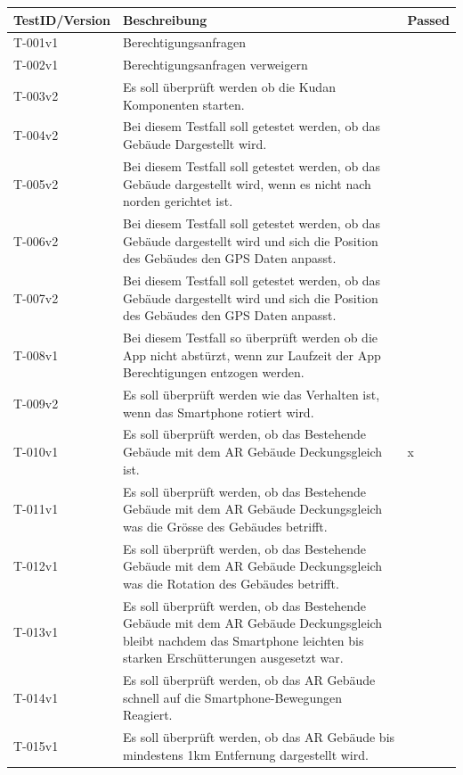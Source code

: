 \documentclass[a4paper]{scrreprt}
\begin{document}
\begin{tabularx}{\textwidth}{|l|X|l|}
\hline
	\textbf{TestID/Version }& \textbf{Beschreibung} & \textbf{Passed} \\
\hline
	T-001v1 & Berechtigungsanfragen & \checkmark \\
\hline
	T-002v1 & Berechtigungsanfragen verweigern & \checkmark \\
\hline
	T-003v2 & Es soll überprüft werden ob die Kudan Komponenten starten. & \checkmark \\
\hline
	T-004v2 & Bei diesem Testfall soll getestet werden, ob das Gebäude Dargestellt wird. & \checkmark \\
\hline
	T-005v2 & Bei diesem Testfall soll getestet werden, ob das Gebäude dargestellt wird, wenn es nicht nach norden gerichtet ist. & \checkmark \\
\hline
	T-006v2 & Bei diesem Testfall soll getestet werden, ob das Gebäude dargestellt wird und sich die Position des Gebäudes den GPS Daten anpasst. & \checkmark \\
\hline
	T-007v2 & Bei diesem Testfall soll getestet werden, ob das Gebäude dargestellt wird und sich die Position des Gebäudes den GPS Daten anpasst. & \checkmark \\
\hline
	T-008v1 & Bei diesem Testfall so überprüft werden ob die App nicht abstürzt, wenn zur Laufzeit der App Berechtigungen entzogen werden. & \checkmark \\
\hline
	T-009v2 & Es soll überprüft werden wie das Verhalten ist, wenn das Smartphone rotiert wird. & \checkmark \\
\hline
	T-010v1 & Es soll überprüft werden, ob das Bestehende Gebäude mit dem AR Gebäude Deckungsgleich ist. & x \\
\hline
	T-011v1 & Es soll überprüft werden, ob das Bestehende Gebäude mit dem AR Gebäude Deckungsgleich was die Grösse des Gebäudes betrifft. & \checkmark \\
\hline
	T-012v1 & Es soll überprüft werden, ob das Bestehende Gebäude mit dem AR Gebäude Deckungsgleich was die Rotation des Gebäudes betrifft. & \checkmark \\
\hline
	T-013v1 & Es soll überprüft werden, ob das Bestehende Gebäude mit dem AR Gebäude Deckungsgleich bleibt nachdem das Smartphone leichten bis starken Erschütterungen ausgesetzt war. & \checkmark \\
\hline
	T-014v1 & Es soll überprüft werden, ob das AR Gebäude schnell auf die Smartphone-Bewegungen Reagiert. & \checkmark \\
\hline
	T-015v1 & Es soll überprüft werden, ob das AR Gebäude bis mindestens 1km Entfernung dargestellt wird. & \checkmark \\
\hline
\end{tabularx}
\end{document}
